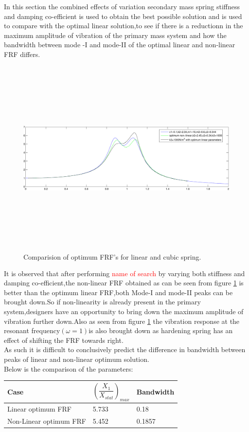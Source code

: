 In this section the combined effects of variation secondary mass spring stiffness and damping co-efficient is used to obtain the best possible solution and is used to compare with the optimal linear solution,to see if there is a reductionn in the maximum amplitude of vibration of the primary mass system and how the bandwidth between mode -I and mode-II of the optimal linear and non-linear FRF differs.
\begin{figure}[h!]
\includegraphics[width=16cm,height=10cm]{"figures/nonlinearity_primaryymass_1"}
\caption{Comparision of optimum FRF's for linear and cubic spring.}
  \label{fig:optimum FRF}
\end{figure}
It is observed that after performing \textcolor{red}{name of search} by varying both stiffness and damping co-efficient,the non-linear FRF obtained as can be seen from figure \ref{fig:optimum FRF} is better than the optimum linear FRF,both Mode-I and mode-II peaks can be brought down.So if non-linearity is already present in the primary system,designers have an opportunity to bring down the maximum amplitude of vibration further down.Also as seen from figure \ref{fig:optimum FRF} the vibration response at the resonant frequency$(\omega=1)$is also brought down as hardening spring has an effect of shifting the FRF towards right.\\
As such it is difficult to conclusively predict the difference in bandwidth between peaks of linear and non-linear optimum solution.\\
Below is the comparison of the parameters:
\begin{table}[h!]
\centering
\begin{tabular}{|m{6cm}|m{2cm}|m{2cm}|} 
\hline
Case& $\left(\dfrac{X_{1}}{X_{stat}}\right)_{max}$ & Bandwidth \\
\hline
Linear optimum FRF & 5.733 & 0.18 

\\
\hline
Non-Linear optimum FRF & 5.452 & 0.1857

 \\ 
\hline
\end{tabular}
\end{table}
